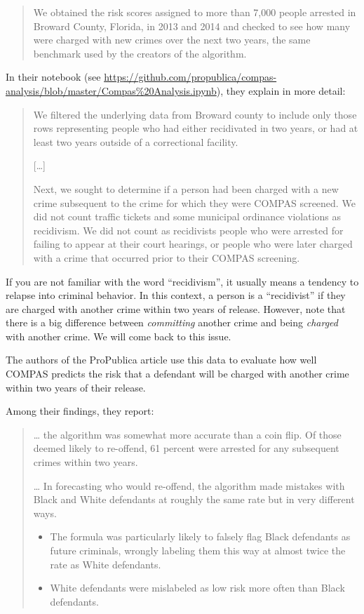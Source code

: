 \begin{quote}
We obtained the risk scores assigned to more than 7,000 people arrested
in Broward County, Florida, in 2013 and 2014 and checked to see how many
were charged with new crimes over the next two years, the same benchmark
used by the creators of the algorithm.
\end{quote}

In their notebook (see
\url{https://github.com/propublica/compas-analysis/blob/master/Compas\%20Analysis.ipynb}),
they explain in more detail:

\begin{quote}
We filtered the underlying data from Broward county to include only
those rows representing people who had either recidivated in two years,
or had at least two years outside of a correctional facility.

{[}\ldots{]}

Next, we sought to determine if a person had been charged with a new
crime subsequent to the crime for which they were COMPAS screened. We
did not count traffic tickets and some municipal ordinance violations as
recidivism. We did not count as recidivists people who were arrested for
failing to appear at their court hearings, or people who were later
charged with a crime that occurred prior to their COMPAS screening.
\end{quote}

If you are not familiar with the word ``recidivism'', it usually means a
tendency to relapse into criminal behavior. In this context, a person is
a ``recidivist'' if they are charged with another crime within two years
of release. However, note that there is a big difference between
\emph{committing} another crime and being \emph{charged} with another
crime. We will come back to this issue.

The authors of the ProPublica article use this data to evaluate how well
COMPAS predicts the risk that a defendant will be charged with another
crime within two years of their release.

Among their findings, they report:

\begin{quote}
\ldots{} the algorithm was somewhat more accurate than a coin flip. Of
those deemed likely to re-offend, 61 percent were arrested for any
subsequent crimes within two years.

\ldots{} In forecasting who would re-offend, the algorithm made mistakes
with Black and White defendants at roughly the same rate but in very
different ways.

\begin{itemize}
\item
  The formula was particularly likely to falsely flag Black defendants
  as future criminals, wrongly labeling them this way at almost twice
  the rate as White defendants.
\item
  White defendants were mislabeled as low risk more often than Black
  defendants.
\end{itemize}
\end{quote}


